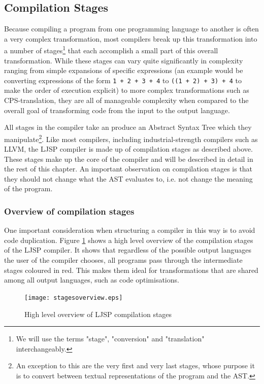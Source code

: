 \documentclass[11pt]{report}
\begin{document}
\subsection{Compilation Stages}
Because compiling a program from one programming language to another is often a very complex transformation, most compilers break up this transformation into a number of stages\footnote{We will use the terms "stage", "conversion" and "translation" interchangeably.} that each accomplish a small part of this overall transformation. While these stages can vary quite significantly in complexity ranging from simple expansions of specific expressions (an example would be converting expressions of the form \hbox{\texttt{1 + 2 + 3 + 4}} to \hbox{\texttt{((1 + 2) + 3) + 4}} to make the order of execution explicit) to more complex transformations such as CPS-translation, they are all of manageable complexity when compared to the overall goal of transforming code from the input to the output language.

All stages in the compiler take an produce an Abstract Syntax Tree which they manipulate\footnote{An exception to this are the very first and very last stages, whose purpose it is to convert between textual representations of the program and the AST.}. Like most compilers, including industrial-strength compilers such as LLVM, the LJSP compiler is made up of compilation stages as described above. These stages make up the core of the compiler and will be described in detail in the rest of this chapter. An important observation on compilation stages is that they should not change what the AST evaluates to, i.e. not change the meaning of the program.

\subsubsection{Overview of compilation stages}
One important consideration when structuring a compiler in this way is to avoid code duplication. Figure \ref{highlevelstages} shows a high level overview of the compilation stages of the LJSP compiler. It shows that regardless of the possible output languages the user of the compiler chooses, all programs pass through the intermediate stages coloured in red. This makes them ideal for transformations that are shared among all output languages, such as code optimisations.

\begin{figure}[ht]
\begin{center}
\texttt{[image: stagesoverview.eps]}
\end{center}
\caption{High level overview of LJSP compilation stages}
\label{highlevelstages}
\end{figure}
\end{document}

